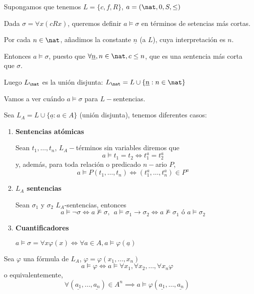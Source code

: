 \begin{example}
Supongamos que tenemos $L = \{c, f, R\}$,  $a = (\nat, 0,S, \leq)$

Dada $\sigma =\forall x(cR x)$, queremos definir $a\vDash \sigma$ en términos de setencias más cortas.

Por cada $n\in \nat$, añadimos la constante $\underline{n}$ (a $L$), cuya interpretación es $n$.

Entonces $a\vDash \sigma$, puesto que $\forall \underline{n}, n\in \nat, c\le n$, que es una sentencia más corta que $\sigma$.

Luego $L_\nat$ es la unión disjunta:
$L_{\nat} = L\cup \{\underline{n}: n\in \nat\}$
\end{example}

\begin{defn}
	Vamos a ver cuándo $a\vDash \sigma$ para $L-$sentencias.

	Sea $L_A = L\cup \{\underline{a}: a \in A\}$ (unión disjunta), tenemos diferentes casos:
	\begin{enumerate}
		\item \textbf{Sentencias atómicas}

		Sean $t_1,\hdots,t_n$, $L_A-$términos sin variables diremos que
		\[a\vDash t_1=t_2 \iff t_1^a=t_2^a\]
		y, además, para toda relación o predicado $n-$ario $P$,
		\[a\vDash P(t_1,\hdots,t_n)\iff (t_1^a,\hdots,t_n^a)\in P^a\]

		\item \textbf{$L_A$ sentencias}

		Sean $\sigma_1$ y $\sigma_2$ $L_A$-sentencias, entonces
		\[a\vDash \neg \sigma \iff a\nvDash \sigma, \ \ a\vDash \sigma_1\rightarrow \sigma_2\iff a\nvDash\sigma_1 \text{ ó } a\vDash\sigma_2\]

		\item \textbf{Cuantificadores}

		$a\vDash \sigma = \forall x\varphi(x)\iff \forall a \in A, a\vDash \varphi(\underline{a})$
	\end{enumerate}
\end{defn}

\begin{prop}
	Sea $\varphi$ una fórmula de $L_A$, $\varphi = \varphi(x_1,\hdots,x_n)$
	\[a\vDash \varphi \iff a\vDash \forall x_1,\forall x_2, \hdots, \forall x_n \varphi\]
	o equivalentemente,
	\[\forall (\underline{a_1}, \hdots, \underline{a_n})\in A^n \implies a\vDash \varphi(\underline{a_1}, \hdots, \underline{a_n})\]
\end{prop}

